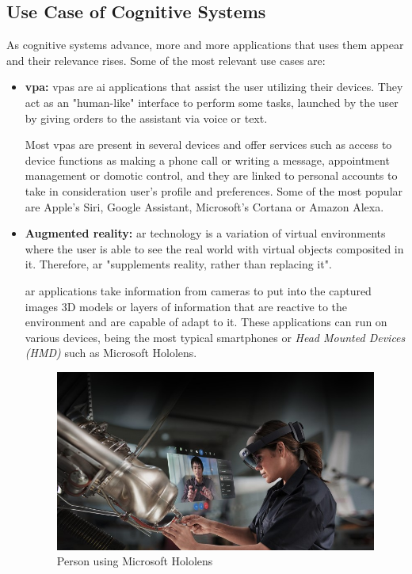 \subsection{Use Case of Cognitive Systems}
As cognitive systems advance, more and more applications that uses them appear and their relevance rises. Some of the most relevant use cases are:
\begin{itemize}
    \item \textbf{\acf{vpa}:} \acp{vpa}\cite{rise_of_bots} are \acl{ai} applications that assist the user utilizing their devices. They act as an "human-like" interface to perform some tasks, launched by the user by giving orders to the assistant via voice or text.
    
    Most \acp{vpa} are present in several devices and offer services such as access to device functions as making a phone call or writing a message, appointment management or domotic control, and they are linked to personal accounts to take in consideration user's profile and preferences. Some of the most popular are Apple's Siri, Google Assistant, Microsoft's Cortana or Amazon Alexa.
    \item \textbf{Augmented reality:} \acf{ar} technology is a variation of virtual environments where the user is able to see the real world with virtual objects composited in it. Therefore, \acs{ar} "supplements reality, rather than replacing it"\cite{augmented_reality_survey}. 
    
    \acs{ar} applications take information from cameras to put into the captured images 3D models or layers of information that are reactive to the environment and are capable of adapt to it. These applications can run on various devices, being the most typical smartphones or \textsl{Head Mounted Devices (HMD)} such as Microsoft Hololens\cite{microsoft_hololens}.
    \begin{figure}[ht]
    \includegraphics[scale=0.6]{docs/img/project_pics/hololens.jpg}
    \centering
    \caption{Person using Microsoft Hololens \cite{hololens_pic}}
    \end{figure}


\end{itemize}
